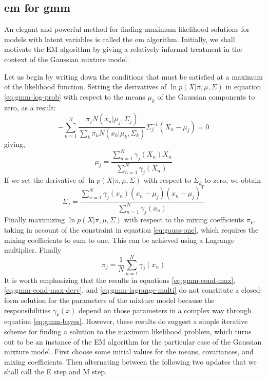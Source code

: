 \documentclass[12pt, a4paper, twoside]{report}
\begin{document}
\subsection{\acrlong{em} for \acrshort{gmm}}
An elegant and powerful method for finding maximum likelihood solutions for models with latent variables is called the \acrfull{em} algorithm. Initially, we shall motivate the EM algorithm by giving a relatively informal treatment in the context of the Gaussian mixture model.
\par
Let us begin by writing down the conditions that must be satisfied at a maximum of the likelihood function. Setting the derivatives of $\ln p(X |\pi, \mu, \Sigma)$ in equation \ref{eq:gmm-log-prob} with respect to the means $\mu_k$ of the Gaussian components to zero, as a result:
\begin{equation}
-\sum_{n=1}^{N}\frac{\pi_j N(x_n|\mu_j,\Sigma_j)}{\sum_{k}\pi_k N(x_k|\mu_k,\Sigma_k)} \Sigma_{j}^{-1}(X_n - \mu_j) = 0
\end{equation}
giving,
\begin{equation}
\mu_j = \frac{\sum_{n=1}^{N}\gamma_j(X_n)X_n}{\sum_{n=1}^{N}\gamma_j(X_n)}
\label{eq:gmm-cond-max}
\end{equation}
If we set the derivative of $\ln p(X |\pi, \mu, \Sigma)$ with respect to $\Sigma_k$ to zero, we obtain
\begin{equation}
\Sigma_j = \frac{\sum_{n=1}^{N}\gamma_j(x_n)(x_n - \mu_j)(x_n-\mu_j)^T}{\sum_{n=1}^{N}\gamma_j(x_n)}
\label{eq:gmm-cond-max-derv}
\end{equation}
Finally maximizing $\ln p(X |\pi, \mu, \Sigma)$ with respect to the mixing coefficients $\pi_k$. taking in account of the constraint in equation \ref{eq:gauss-one}, which requires the mixing coefficients to sum to one. This can be achieved using a Lagrange multiplier. Finally
\begin{equation}
\pi_j = \frac{1}{N}\sum_{n=1}^{N}\gamma_j(x_n)
\label{eq:gmm-lagrange-multi}
\end{equation}
It is worth emphasizing that the results in equations \ref{eq:gmm-cond-max}, \ref{eq:gmm-cond-max-derv}, and \ref{eq:gmm-lagrange-multi} do not constitute a closed-form solution for the parameters of the mixture model because the responsibilities $\gamma_k(x)$ depend on those parameters in a complex way through equation \ref{eq:gmm-bayes}. However, these results do suggest a simple iterative scheme for finding a solution to the maximum likelihood problem, which turns out to be an instance of the EM algorithm for the particular case of the Gaussian mixture model. First choose some initial values for the means, covariances, and mixing coefficients. Then alternating between the following two updates that we shall call the E step and M step.
\end{document}
